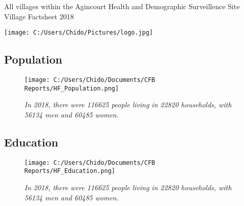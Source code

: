 \documentclass[
]{article}
\author{}
\date{\vspace{-2.5em}}
\begin{document}
\begin{row}

\begin{col-md-4}

All villages within the Agincourt Health and Demographic Surveillence
Site Village Factsheet 2018

\end{col-md-4}

\begin{col-md-7}

\texttt{[image: C:/Users/Chido/Pictures/logo.jpg]}

\end{col-md-7}

\end{row}

\begin{row}

\begin{col-md-4}

\hypertarget{population}{%
\subsection{Population}\label{population}}

\begin{figure}
\centering
\texttt{[image: C:/Users/Chido/Documents/CFB Reports/HF\_Population.png]}
\caption{\emph{In 2018, there were 116625 people living in 22820
households, with 56134 men and 60485 women.}}
\end{figure}

\end{col-md-4}

\begin{col-md-4}

\hypertarget{education}{%
\subsection{Education}\label{education}}

\begin{figure}
\centering
\texttt{[image: C:/Users/Chido/Documents/CFB Reports/HF\_Education.png]}
\caption{\emph{In 2018, there were 116625 people living in 22820
households, with 56134 men and 60485 women.}}
\end{figure}

\end{col-md-4}

\begin{col-md-4}


\end{col-md-4}
\end{row}
\end{document}

